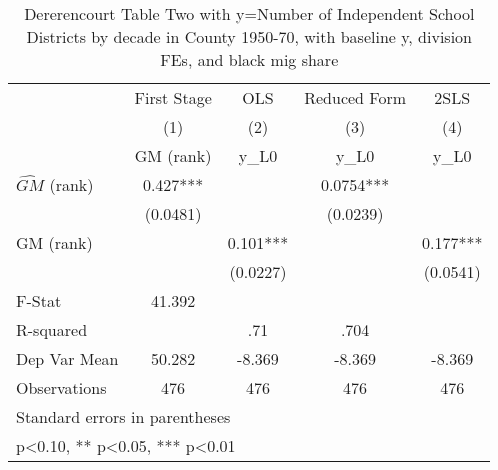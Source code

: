 \begin{table}[htbp]\centering
\def\sym#1{\ifmmode^{#1}\else\(^{#1}\)\fi}
\caption{Dererencourt Table Two with y=Number of Independent School Districts by decade in County 1950-70, with baseline y, division FEs, and black mig share}
\begin{tabular}{l*{4}{c}}
\toprule
                    & First Stage   &         OLS   &Reduced Form   &        2SLS   \\
                    &\multicolumn{1}{c}{(1)}&\multicolumn{1}{c}{(2)}&\multicolumn{1}{c}{(3)}&\multicolumn{1}{c}{(4)}\\
                    &\multicolumn{1}{c}{GM  (rank)}&\multicolumn{1}{c}{y\_L0}&\multicolumn{1}{c}{y\_L0}&\multicolumn{1}{c}{y\_L0}\\
\midrule
$\hat{GM}$ (rank)   &       0.427***&               &      0.0754***&               \\
                    &    (0.0481)   &               &    (0.0239)   &               \\
\addlinespace
GM  (rank)          &               &       0.101***&               &       0.177***\\
                    &               &    (0.0227)   &               &    (0.0541)   \\
\midrule
F-Stat              &      41.392   &               &               &               \\
R-squared           &               &         .71   &        .704   &               \\
Dep Var Mean        &      50.282   &      -8.369   &      -8.369   &      -8.369   \\
Observations        &         476   &         476   &         476   &         476   \\
\bottomrule
\multicolumn{5}{l}{\footnotesize Standard errors in parentheses}\\
\multicolumn{5}{l}{\footnotesize * p<0.10, ** p<0.05, *** p<0.01}\\
\end{tabular}
\end{table}

